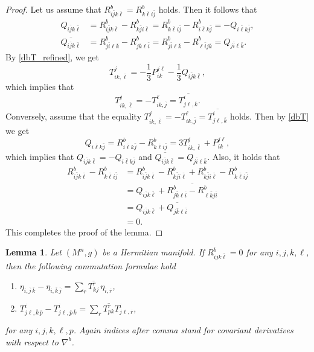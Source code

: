 \documentclass{amsart}
\numberwithin{equation}{section}
\newtheorem{lemma}  [theorem]     {Lemma}
\theoremstyle{definition}
\renewcommand{\1}{\mathds{1}}
\renewcommand{\>}{\rightarrow}
\begin{document}
\begin{proof}
Let us assume that $R^b_{i \bar{j} k \bar{\ell}} = R^b_{k \bar{\ell} i \bar{j}}$ holds. Then it follows that
\[\begin{aligned}
Q_{i\bar{j}k\bar{\ell}} &= R^b_{i\bar{j}k\bar{\ell}} - R^b_{k\bar{j}i\bar{\ell}}
= R^b_{k\bar{\ell}i\bar{j}} - R^b_{i\bar{\ell}k\bar{j}} = -Q_{i\bar{\ell}k\bar{j}},\\
\overline{Q_{i\bar{j}k\bar{\ell}}} &= R^b_{j\bar{i}\ell\bar{k}} - R^b_{j\bar{k}\ell\bar{i}}
= R^b_{j\bar{i}\ell\bar{k}} - R^b_{\ell\bar{i}j\bar{k}} = Q_{j\bar{i}\ell\bar{k}}.
\end{aligned}\]
By \eqref{dbT_refined}, we get
\[T^j_{ik,\bar{\ell}} = -\frac{1}{3}P_{ik}^{j \ell} - \frac{1}{3}Q_{i\bar{j}k\bar{\ell}},\]
which implies that
\[T^j_{ik ,\overline{\ell }} = - T^{\ell}_{ik ,\overline{j } } = \overline{  T^i_{j\ell  ,\overline{k }} }.\]
Conversely, assume that the equality $T^j_{ik ,\overline{\ell }} = - T^{\ell}_{ik ,\overline{j } } = \overline{  T^i_{j\ell  ,\overline{k }} }$ holds. Then by \eqref{dbT} we get
\[Q_{i\bar{\ell}k\bar{j}}=R^{b}_{i\bar{\ell}k\bar{j}}-R^b_{k\bar{\ell}i\bar{j}} =3 T_{ik,\bar{\ell}}^j + P^{j\ell}_{ik},\]
which implies that $Q_{i\bar{j}k\bar{\ell}} = -Q_{i\bar{\ell}k\bar{j}}$ and $\overline{Q_{i\bar{j}k\bar{\ell}}}= Q_{j\bar{i}\ell\bar{k}}$. Also, it holds that
\[\begin{aligned}
R^b_{i \bar{j} k \bar{\ell}} - R^b_{k \bar{\ell} i \bar{j}} &= R^b_{i \bar{j} k \bar{\ell}} - R^b_{k\bar{j}i\bar{\ell}}
+R^b_{k\bar{j}i\bar{\ell}} - R^b_{k \bar{\ell} i \bar{j}} \\
&= Q_{i\bar{j}k\bar{\ell}} + \overline{R^b_{j\bar{k}\ell\bar{i}} - R^b_{\ell \bar{k} j \bar{i}}}\\
&= Q_{i\bar{j}k\bar{\ell}} + \overline{Q_{j\bar{k}\ell\bar{i}}} \\
&= 0.
\end{aligned}\]
This completes the proof of the lemma. \end{proof}

\begin{lemma}\label{commt}
Let $(M^n,g)$ be a Hermitian manifold. If $R^b_{ijk\bar{\ell}}=0$ for any $i,j,k,\ell$, then the following commutation formulae hold
\begin{enumerate}
\item $\eta_{i, \overline{j}\,\overline{k} } - \eta_{i, \overline{k}\,\overline{j} }  =   \sum_r \overline{T^{r}_{kj}} \, \eta_{i, \overline{r}}$,
\item $T^i_{j\ell , \overline{k} \, \overline{p}} - T^i_{j\ell , \overline{p} \, \overline{k} } =   \sum_r \overline{T^r_{pk} } T^i_{j\ell , \overline{r}}$,
\end{enumerate}
for any $i,j,k,\ell,p$. Again indices after comma stand for covariant derivatives with respect to $\nabla^b$.
\end{lemma}
\end{document}
